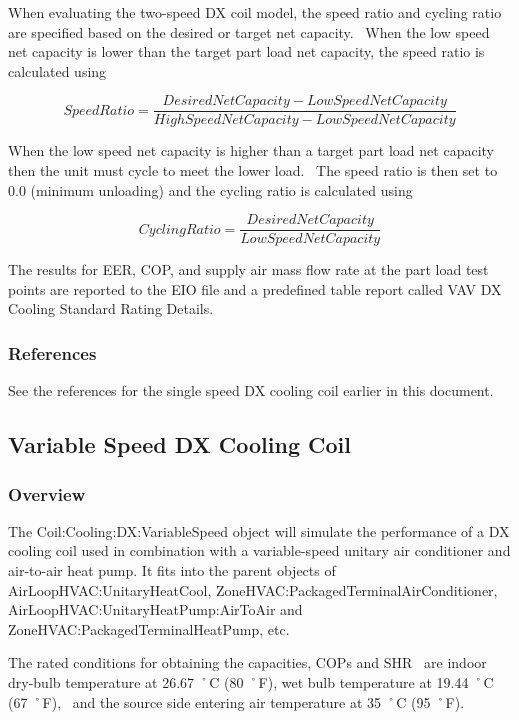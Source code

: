 When evaluating the two-speed DX coil model, the speed ratio and cycling ratio are specified based on the desired or target net capacity.~ When the low speed net capacity is lower than the target part load net capacity, the speed ratio is calculated using

\begin{equation}
SpeedRatio = \frac{{DesiredNetCapacity - LowSpeedNetCapacity}}{{HighSpeedNetCapacity - LowSpeedNetCapacity}}
\end{equation}

When the low speed net capacity is higher than a target part load net capacity then the unit must cycle to meet the lower load.~ The speed ratio is then set to 0.0 (minimum unloading) and the cycling ratio is calculated using

\begin{equation}
CyclingRatio = \frac{{DesiredNetCapacity}}{{LowSpeedNetCapacity}}
\end{equation}

The results for EER, COP, and supply air mass flow rate at the part load test points are reported to the EIO file and a predefined table report called VAV DX Cooling Standard Rating Details.

\subsubsection{References}\label{references-4-001}

See the references for the single speed DX cooling coil earlier in this document.

\subsection{Variable Speed DX Cooling Coil}\label{variable-speed-dx-cooling-coil}

\subsubsection{Overview}\label{overview-4-002}

The Coil:Cooling:DX:VariableSpeed object will simulate the performance of a DX cooling coil used in combination with a variable-speed unitary air conditioner and air-to-air heat pump. It fits into the parent objects of AirLoopHVAC:UnitaryHeatCool, ZoneHVAC:PackagedTerminalAirConditioner, AirLoopHVAC:UnitaryHeatPump:AirToAir and ZoneHVAC:PackagedTerminalHeatPump, etc.

The rated conditions for obtaining the capacities, COPs and SHR~ are indoor dry-bulb temperature at 26.67 ˚C (80 ˚F), wet bulb temperature at 19.44 ˚C (67 ˚F),~ and the source side entering air temperature at 35 ˚C (95 ˚F).

